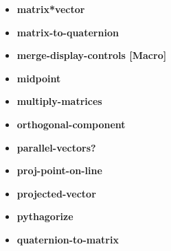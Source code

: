 \documentclass [11pt]{book}
\begin{document}
\begin{itemize}
\item {}
\label{prim:matrix*vector}
\textbf{matrix*vector}





\item {}
\label{prim:matrix-to-quaternion}
\textbf{matrix-to-quaternion}





\item {}
\label{prim:merge-display-controls}
\textbf{merge-display-controls [Macro]}





\item {}
\label{prim:midpoint}
\textbf{midpoint}





\item {}
\label{prim:multiply-matrices}
\textbf{multiply-matrices}





\item {}
\label{prim:orthogonal-component}
\textbf{orthogonal-component}





\item {}
\label{prim:parallel-vectors?}
\textbf{parallel-vectors?}





\item {}
\label{prim:proj-point-on-line}
\textbf{proj-point-on-line}





\item {}
\label{prim:projected-vector}
\textbf{projected-vector}





\item {}
\label{prim:pythagorize}
\textbf{pythagorize}





\item {}
\label{prim:quaternion-to-matrix}
\textbf{quaternion-to-matrix}






\end{itemize}
\end{document}
